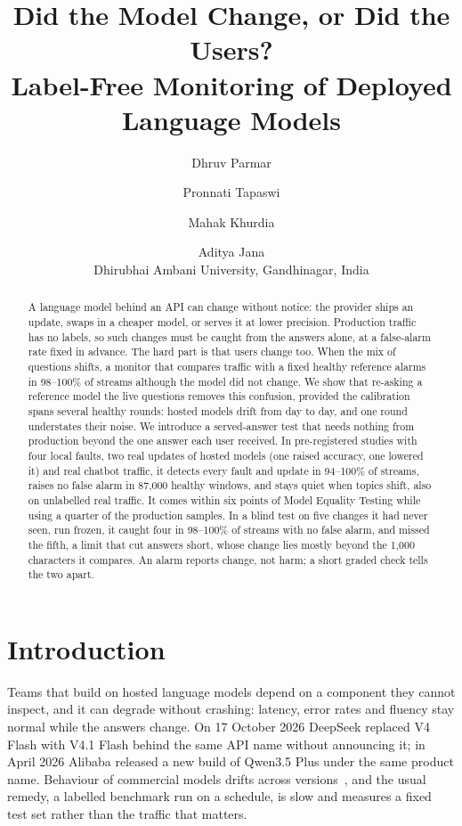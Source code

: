 \documentclass[11pt]{article}
\title{Did the Model Change, or Did the Users?\\Label-Free Monitoring of Deployed Language Models}
\author{Dhruv Parmar \and Pronnati Tapaswi \and Mahak Khurdia \and Aditya Jana \\
  Dhirubhai Ambani University, Gandhinagar, India}
\begin{document}
\maketitle

\begin{abstract}
A language model behind an API can change without notice: the provider ships an
update, swaps in a cheaper model, or serves it at lower precision. Production
traffic has no labels, so such changes must be caught from the answers alone, at
a false-alarm rate fixed in advance. The hard part is that users change too. When
the mix of questions shifts, a monitor that compares traffic with a fixed healthy
reference alarms in 98--100\% of streams although the model did not change. We
show that re-asking a reference model the live questions removes this confusion,
provided the calibration spans several healthy rounds: hosted models drift from
day to day, and one round understates their noise. We introduce a served-answer
test that needs nothing from production beyond the one answer each user received.
In pre-registered studies with four local faults, two real updates of hosted
models (one raised accuracy, one lowered it) and real chatbot traffic, it detects every
fault and update in 94--100\% of streams, raises no false alarm in 87{,}000
healthy windows, and stays quiet when topics shift, also on unlabelled real
traffic. It comes within six points of Model Equality Testing while using a
quarter of the production samples. In a blind test on five changes it had never
seen, run frozen, it caught four in 98--100\% of streams with no false alarm, and
missed the fifth, a limit that cut answers short, whose change lies mostly
beyond the 1{,}000 characters it compares. An alarm reports change, not harm; a short graded check tells the two
apart.
\end{abstract}

\section{Introduction}

Teams that build on hosted language models depend on a component they cannot
inspect, and it can degrade without crashing: latency, error rates and fluency stay
normal while the answers change. On 17 October 2026 DeepSeek replaced V4 Flash with V4.1 Flash behind the
same API name without announcing it; in April 2026 Alibaba released a new build
of Qwen3.5 Plus under the same product name. Behaviour of
commercial models drifts across versions~\citep{chen2023chatgpt}, and the usual
remedy, a labelled benchmark run on a schedule, is slow and measures a fixed test
set rather than the traffic that matters.
\end{document}
